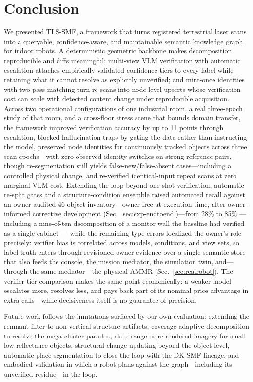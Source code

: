 \section{Conclusion}
\label{sec:conclusion}

We presented TLS-SMF, a framework that turns registered terrestrial laser scans into
a queryable, confidence-aware, and maintainable semantic knowledge graph for
indoor robots. A deterministic geometric backbone makes decomposition
reproducible and diffs meaningful; multi-view VLM verification with automatic
escalation attaches empirically validated confidence tiers to every label
while retaining what it
cannot resolve as explicitly unverified; and mint-once identities with
two-pass matching turn re-scans into node-level upserts whose
verification cost can scale with detected content change under
reproducible acquisition. Across two operational configurations of one
industrial room, a real three-epoch study of that room, and a
cross-floor stress scene that bounds domain transfer, the framework improved verification accuracy by up to 11
points through escalation, blocked hallucination traps by gating the data
rather than instructing the model, preserved node identities for
continuously tracked objects across three scan epochs---with zero
observed identity switches on strong reference pairs, though
re-segmentation still yields false-new/false-absent cases---including a
controlled physical change, and re-verified identical-input repeat scans
at zero marginal VLM cost. Extending the loop beyond one-shot
verification, automatic re-split gates and a structure-condition ensemble
raised automated recall against an owner-audited 46-object
inventory---owner-free at execution time, after owner-informed corrective
development (Sec.~\ref{sec:exp-endtoend})---from 28\% to 85\% --- including a nine-of-ten decomposition of a monitor
wall the baseline had verified as a single cabinet --- while the remaining
type errors localized the owner's role precisely: verifier bias is
correlated across models, conditions, and view sets, so label truth enters
through revisioned owner evidence over a single semantic store that also
feeds the console, the mission mediator, the simulation twin, and---through
the same mediator---the physical AMMR (Sec.~\ref{sec:realrobot}). The
verifier-tier comparison makes the same point economically: a weaker model
escalates more, resolves less, and pays back part of its nominal price
advantage in extra calls---while decisiveness itself is no guarantee of
precision.

Future work follows the limitations surfaced by our own evaluation:
extending the remnant filter to non-vertical structure artifacts,
coverage-adaptive decomposition to resolve the mega-cluster paradox,
close-range or re-rendered imagery for small low-reflectance objects,
structural-change updating beyond the object level, automatic place
segmentation to close the loop with the DK-SMF lineage, and embodied
validation in which a robot plans against the graph---including its
unverified residue---in the loop.
